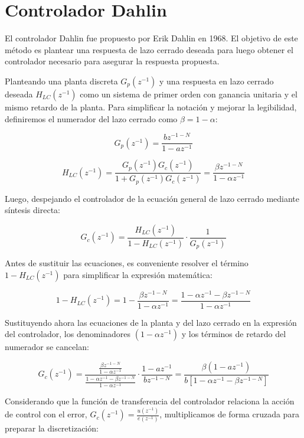 \section{Controlador Dahlin}
El controlador Dahlin fue propuesto por Erik Dahlin en 1968. El objetivo de este método es plantear una respuesta de lazo cerrado deseada para luego obtener el controlador necesario para asegurar la respuesta propuesta.

Planteando una planta discreta $G_p(z^{-1})$ y una respuesta en lazo cerrado deseada $H_{LC}(z^{-1})$ como un sistema de primer orden con ganancia unitaria y el mismo retardo de la planta. Para simplificar la notación y mejorar la legibilidad, definiremos el numerador del lazo cerrado como $\beta = 1 - \alpha$:

\begin{equation}
  G_p(z^{-1}) = \frac{b z^{-1-N}}{1 - a z^{-1}}
\end{equation}

\begin{equation}
  H_{LC}(z^{-1}) = \frac{G_p(z^{-1})G_c(z^{-1})}{1 + G_p(z^{-1})G_c(z^{-1})} = \frac{\beta z^{-1-N}}{1 - \alpha z^{-1}}
\end{equation}

Luego, despejando el controlador de la ecuación general de lazo cerrado mediante síntesis directa:

\[
  G_c(z^{-1}) = \frac{H_{LC}(z^{-1})}{1 - H_{LC}(z^{-1})} \cdot \frac{1}{G_p(z^{-1})}
\]

Antes de sustituir las ecuaciones, es conveniente resolver el término $1 - H_{LC}(z^{-1})$ para simplificar la expresión matemática:

\[
  1 - H_{LC}(z^{-1}) = 1 - \frac{\beta z^{-1-N}}{1 - \alpha z^{-1}} = \frac{1 - \alpha z^{-1} - \beta z^{-1-N}}{1 - \alpha z^{-1}}
\]

Sustituyendo ahora las ecuaciones de la planta y del lazo cerrado en la expresión del controlador, los denominadores $(1 - \alpha z^{-1})$ y los términos de retardo del numerador se cancelan:

\begin{equation}
  G_c(z^{-1}) = \frac{\frac{\beta z^{-1-N}}{1 - \alpha z^{-1}}}{\frac{1 - \alpha z^{-1} - \beta z^{-1-N}}{1 - \alpha z^{-1}}} \cdot \frac{1 - a z^{-1}}{b z^{-1-N}} = \frac{\beta(1 - a z^{-1})}{b \left[ 1 - \alpha z^{-1} - \beta z^{-1-N} \right]}
\end{equation}

Considerando que la función de transferencia del controlador relaciona la acción de control con el error, $G_c(z^{-1}) = \frac{u(z^{-1})}{e(z^{-1})}$, multiplicamos de forma cruzada para preparar la discretización:

